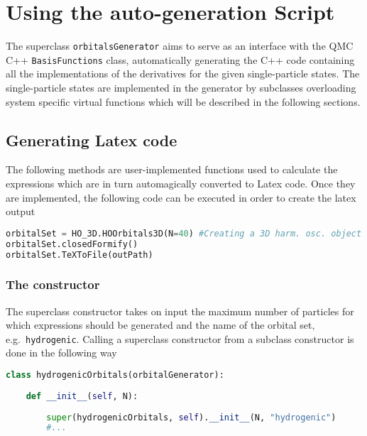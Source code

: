\section{Using the auto-generation Script}

The superclass \verb+orbitalsGenerator+ aims to serve as an interface with the QMC C++ \verb+BasisFunctions+ class, automatically generating the C++ code containing all the implementations of the derivatives for the given single-particle states. The single-particle states are implemented in the generator by subclasses overloading system specific virtual functions which will be described in the following sections.

\subsection{Generating Latex code}

The following methods are user-implemented functions used to calculate the expressions which are in turn automagically converted to Latex code. Once they are implemented, the following code can be executed in order to create the latex output

\vspace{0.25cm}
\begin{lstlisting}[language=Python]
orbitalSet = HO_3D.HOOrbitals3D(N=40) #Creating a 3D harm. osc. object
orbitalSet.closedFormify() 
orbitalSet.TeXToFile(outPath)
\end{lstlisting}

\subsubsection{The constructor}

The superclass constructor takes on input the maximum number of particles for which expressions should be generated and the name of the orbital set, e.g.~\verb+hydrogenic+.
Calling a superclass constructor from a subclass constructor is done in the following way

\vspace{0.25cm}
\begin{lstlisting}[language=Python, otherkeywords={self}]
class hydrogenicOrbitals(orbitalGenerator):
 
    def __init__(self, N):
      
        super(hydrogenicOrbitals, self).__init__(N, "hydrogenic")
        #...
\end{lstlisting}


